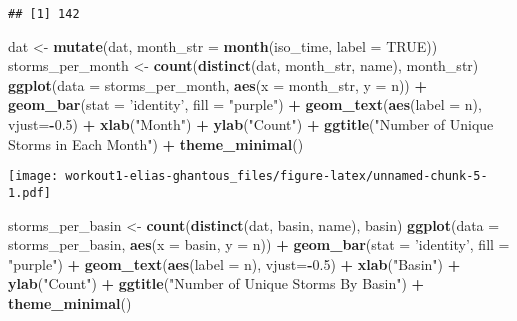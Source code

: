 \documentclass[]{article}
\newenvironment{Shaded}{\begin{snugshade}}{\end{snugshade}}
\newcommand{\KeywordTok}[1]{\textcolor[rgb]{0.13,0.29,0.53}{\textbf{#1}}}
\newcommand{\DataTypeTok}[1]{\textcolor[rgb]{0.13,0.29,0.53}{#1}}
\newcommand{\FloatTok}[1]{\textcolor[rgb]{0.00,0.00,0.81}{#1}}
\newcommand{\StringTok}[1]{\textcolor[rgb]{0.31,0.60,0.02}{#1}}
\newcommand{\OtherTok}[1]{\textcolor[rgb]{0.56,0.35,0.01}{#1}}
\newcommand{\OperatorTok}[1]{\textcolor[rgb]{0.81,0.36,0.00}{\textbf{#1}}}
\newcommand{\NormalTok}[1]{#1}
\begin{document}
\begin{verbatim}
## [1] 142
\end{verbatim}

\begin{Shaded}
\begin{Highlighting}[]
\NormalTok{dat <-}\StringTok{ }\KeywordTok{mutate}\NormalTok{(dat, }\DataTypeTok{month_str =} \KeywordTok{month}\NormalTok{(iso_time, }\DataTypeTok{label =} \OtherTok{TRUE}\NormalTok{))}
\NormalTok{storms_per_month <-}\StringTok{ }\KeywordTok{count}\NormalTok{(}\KeywordTok{distinct}\NormalTok{(dat, month_str, name), month_str)}
\KeywordTok{ggplot}\NormalTok{(}\DataTypeTok{data =}\NormalTok{ storms_per_month, }\KeywordTok{aes}\NormalTok{(}\DataTypeTok{x =}\NormalTok{ month_str, }\DataTypeTok{y =}\NormalTok{ n)) }\OperatorTok{+}\StringTok{ }\KeywordTok{geom_bar}\NormalTok{(}\DataTypeTok{stat =} \StringTok{'identity'}\NormalTok{, }\DataTypeTok{fill =} \StringTok{"purple"}\NormalTok{) }\OperatorTok{+}\StringTok{ }\KeywordTok{geom_text}\NormalTok{(}\KeywordTok{aes}\NormalTok{(}\DataTypeTok{label =}\NormalTok{ n), }\DataTypeTok{vjust=}\OperatorTok{-}\FloatTok{0.5}\NormalTok{) }\OperatorTok{+}
\StringTok{  }\KeywordTok{xlab}\NormalTok{(}\StringTok{"Month"}\NormalTok{) }\OperatorTok{+}\StringTok{ }\KeywordTok{ylab}\NormalTok{(}\StringTok{"Count"}\NormalTok{) }\OperatorTok{+}\StringTok{ }\KeywordTok{ggtitle}\NormalTok{(}\StringTok{"Number of Unique Storms in Each Month"}\NormalTok{) }\OperatorTok{+}\StringTok{ }\KeywordTok{theme_minimal}\NormalTok{()}
\end{Highlighting}
\end{Shaded}

\texttt{[image: workout1-elias-ghantous\_files/figure-latex/unnamed-chunk-5-1.pdf]}

\begin{Shaded}
\begin{Highlighting}[]
\NormalTok{storms_per_basin <-}\StringTok{ }\KeywordTok{count}\NormalTok{(}\KeywordTok{distinct}\NormalTok{(dat, basin, name), basin)}
\KeywordTok{ggplot}\NormalTok{(}\DataTypeTok{data =}\NormalTok{ storms_per_basin, }\KeywordTok{aes}\NormalTok{(}\DataTypeTok{x =}\NormalTok{ basin, }\DataTypeTok{y =}\NormalTok{ n)) }\OperatorTok{+}\StringTok{ }\KeywordTok{geom_bar}\NormalTok{(}\DataTypeTok{stat =} \StringTok{'identity'}\NormalTok{, }\DataTypeTok{fill =} \StringTok{"purple"}\NormalTok{) }\OperatorTok{+}\StringTok{ }\KeywordTok{geom_text}\NormalTok{(}\KeywordTok{aes}\NormalTok{(}\DataTypeTok{label =}\NormalTok{ n), }\DataTypeTok{vjust=}\OperatorTok{-}\FloatTok{0.5}\NormalTok{) }\OperatorTok{+}
\StringTok{  }\KeywordTok{xlab}\NormalTok{(}\StringTok{"Basin"}\NormalTok{) }\OperatorTok{+}\StringTok{ }\KeywordTok{ylab}\NormalTok{(}\StringTok{"Count"}\NormalTok{) }\OperatorTok{+}\StringTok{ }\KeywordTok{ggtitle}\NormalTok{(}\StringTok{"Number of Unique Storms By Basin"}\NormalTok{) }\OperatorTok{+}\StringTok{ }\KeywordTok{theme_minimal}\NormalTok{()}
\end{Highlighting}
\end{Shaded}
\end{document}

